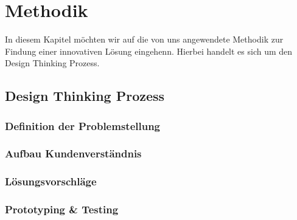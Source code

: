 \newpage

\section{Methodik} \label{anwendung}
In diesem Kapitel möchten wir auf die von uns angewendete Methodik zur Findung einer innovativen Lösung eingehenn. Hierbei handelt es sich um den Design Thinking Prozess.

\subsection{Design Thinking Prozess} \label{designThinking}

\subsubsection{Definition der Problemstellung} \label{definitionProblemstellung}

\subsubsection{Aufbau Kundenverständnis} \label{aufbauKundenverstaendnis}

\subsubsection{Lösungsvorschläge} \label{loesungsvorschlaege}

\subsubsection{Prototyping \& Testing} \label{prototypingTesting}
